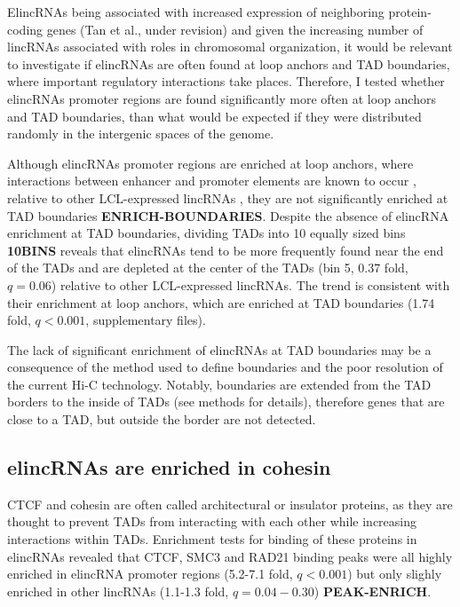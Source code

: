 \documentclass[11pt,a4paper]{report}
\begin{document}
ElincRNAs being associated with increased expression of neighboring protein-coding genes (Tan et al., under revision) and given the increasing number of lincRNAs associated with roles in chromosomal organization, it would be relevant to investigate if elincRNAs are often found at loop anchors and TAD boundaries, where important regulatory interactions take places. Therefore, I tested whether elincRNAs promoter regions are found significantly more often at loop anchors and TAD boundaries, than what would be expected if they were distributed randomly in the intergenic spaces of the genome. 

Although elincRNAs promoter regions are enriched at loop anchors, where interactions between enhancer and promoter elements are known to occur \cite{Ji2016}, relative to other LCL-expressed lincRNAs , they are not significantly enriched at TAD boundaries \textbf{ENRICH-BOUNDARIES}. Despite the absence of elincRNA enrichment at TAD boundaries, dividing TADs into 10 equally sized bins \textbf{10BINS} reveals that elincRNAs tend to be more frequently found near the end of the TADs and are depleted at the center of the TADs (bin 5, 0.37 fold, $q=0.06$) relative to other LCL-expressed lincRNAs. The trend is consistent with their enrichment at loop anchors, which are enriched at TAD boundaries (1.74 fold, $q<0.001$, supplementary files).

The lack of significant enrichment  of elincRNAs at TAD boundaries  may be a consequence of the method used to define boundaries and the poor resolution of the current Hi-C technology. Notably, boundaries are extended from the TAD borders  to the inside of TADs (see methods for details), therefore genes that are close to a TAD, but outside the border are not detected.

\subsection*{elincRNAs are enriched in cohesin}

CTCF and cohesin are often called architectural or insulator proteins, as they are thought to prevent TADs from interacting with each other while increasing interactions within TADs. Enrichment tests for binding of these proteins in elincRNAs revealed that CTCF, SMC3 and RAD21 binding peaks were all highly enriched in elincRNA promoter regions (5.2-7.1 fold, $q<0.001$) but only slighly enriched in other lincRNAs (1.1-1.3 fold, $q= 0.04-0.30$) \textbf{PEAK-ENRICH}.
\end{document}
